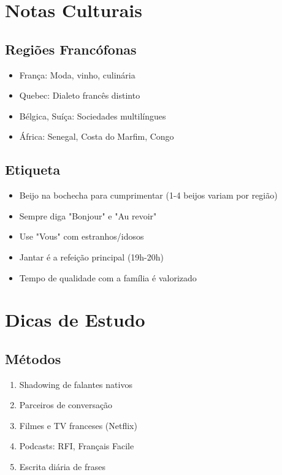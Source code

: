 \documentclass[a4paper,12pt]{article}
\begin{document}
\section{Notas Culturais}
\subsection{Regiões Francófonas}
\begin{itemize}
    \item França: Moda, vinho, culinária
    \item Quebec: Dialeto francês distinto
    \item Bélgica, Suíça: Sociedades multilíngues
    \item África: Senegal, Costa do Marfim, Congo
\end{itemize}
\subsection{Etiqueta}
\begin{itemize}
    \item Beijo na bochecha para cumprimentar (1-4 beijos variam por região)
    \item Sempre diga "Bonjour" e "Au revoir"
    \item Use "Vous" com estranhos/idosos
    \item Jantar é a refeição principal (19h-20h)
    \item Tempo de qualidade com a família é valorizado
\end{itemize}

\section{Dicas de Estudo}
\subsection{Métodos}
\begin{enumerate}
    \item Shadowing de falantes nativos
    \item Parceiros de conversação
    \item Filmes e TV franceses (Netflix)
    \item Podcasts: RFI, Français Facile
    \item Escrita diária de frases
\end{enumerate}
\end{document}
